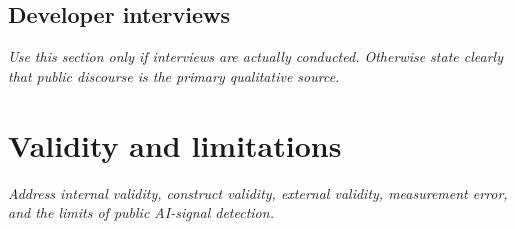 \subsection{Developer interviews}
\textit{Use this section only if interviews are actually conducted. Otherwise state clearly that public discourse is the primary qualitative source.}

\section{Validity and limitations}
\textit{Address internal validity, construct validity, external validity, measurement error, and the limits of public AI-signal detection.}
